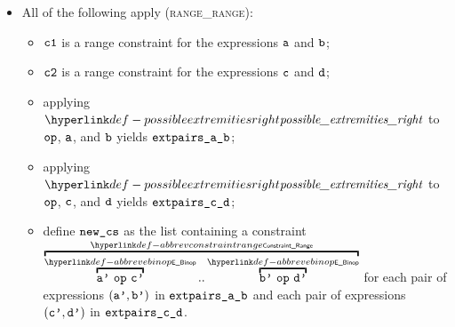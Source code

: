 \begin{itemize}
  \item All of the following apply (\textsc{range\_range}):
  \begin{itemize}
    \item $\vcone$ is a range constraint for the expressions $\va$ and $\vb$;
    \item $\vctwo$ is a range constraint for the expressions $\vc$ and $\vd$;
    \item applying $\possibleextremitiesright$ to $\op$, $\va$, and $\vb$ yields $\extpairsab$;
    \item applying $\possibleextremitiesright$ to $\op$, $\vc$, and $\vd$ yields $\extpairscd$;
    \item define $\newcs$ as the list containing a constraint $\AbbrevConstraintRange{\AbbrevEBinop{\op}{\vap}{\vcp}}{\AbbrevEBinop{\op}{\vbp}{\vdp}}$
          for each pair of expressions
          $(\vap, \vbp)$ in $\extpairsab$
          and each pair of expressions
          $(\vcp, \vdp)$ in $\extpairscd$.
  \end{itemize}
\end{itemize}

\FormallyParagraph
\begin{mathpar}
\end{mathpar}

\begin{mathpar}
\end{mathpar}

\begin{mathpar}
\end{mathpar}

